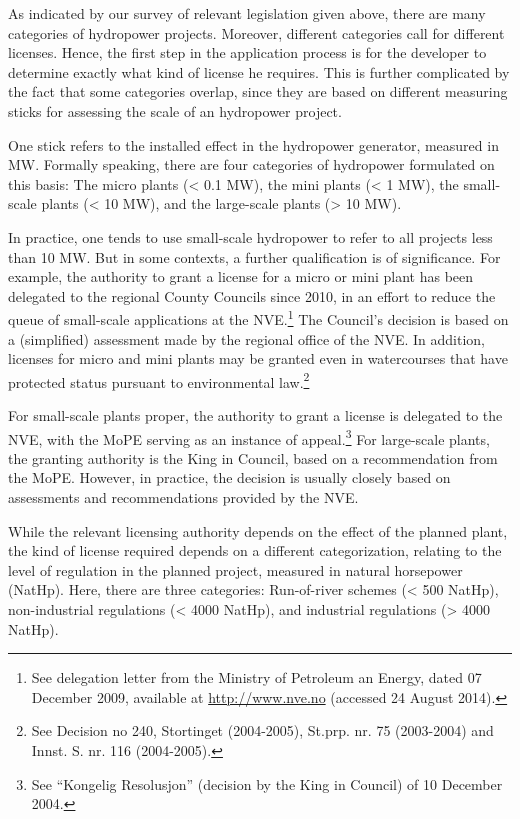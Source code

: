 As indicated by our survey of relevant legislation given above, there are many categories of hydropower projects. Moreover, different categories call for different licenses. Hence, the first step in the application process is for the developer to determine exactly what kind of license he requires. This is further complicated by the fact that some categories overlap, since they are based on different measuring sticks for assessing the scale of an hydropower project. 

One stick refers to the installed effect in the hydropower generator, measured in MW. Formally speaking, there are four categories of hydropower formulated on this basis: The micro plants (< 0.1 MW), the mini plants (< 1 MW), the small-scale plants (< 10 MW), and the large-scale plants (> 10 MW). 

In practice, one tends to use small-scale hydropower to refer to all projects less than 10 MW. But in some contexts, a further qualification is of significance. For example, the authority to grant a license for a micro or mini plant has been delegated to the regional County Councils since 2010, in an effort to reduce the queue of small-scale applications at the NVE.\footnote{See delegation letter from the Ministry of Petroleum an Energy, dated 07 December 2009, available at \url{http://www.nve.no} (accessed 24 August 2014).} The Council's decision is based on a (simplified) assessment made by the regional office of the NVE. In addition, licenses for micro and mini plants may be granted even in watercourses that have protected status pursuant to environmental law.\footnote{See Decision no 240, Stortinget (2004-2005), St.prp. nr. 75 (2003-2004) and Innst. S. nr. 116 (2004-2005).}  

For small-scale plants proper, the authority to grant a license is delegated to the NVE, with the MoPE serving as an instance of appeal.\footnote{See ``Kongelig Resolusjon'' (decision by the King in Council) of 10 December 2004.} For large-scale plants, the granting authority is the King in Council, based on a recommendation from the MoPE. However, in practice, the decision is usually closely based on assessments and recommendations provided by the NVE. 

While the relevant licensing authority depends on the effect of the planned plant, the kind of license required depends on a different categorization, relating to the level of regulation in the planned project, measured in natural horsepower (NatHp). Here, there are three categories: Run-of-river schemes  (< 500 NatHp), non-industrial regulations (< 4000 NatHp), and industrial regulations (> 4000 NatHp). %

